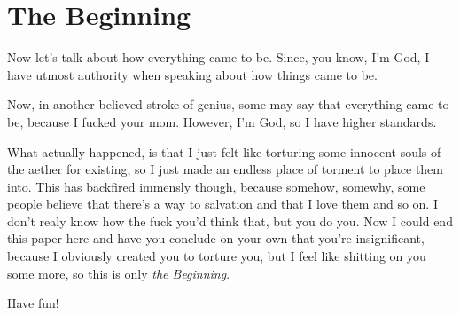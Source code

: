 \section{The Beginning}

Now let's talk about how everything came to be. Since, you know, I'm God, I have utmost authority when speaking about how things came to be.

Now, in another believed stroke of genius, some may say that everything came to be, because I fucked your mom. However, I'm God, so I have higher standards.

What actually happened, is that I just felt like torturing some innocent souls of the aether for existing, so I just made an endless place of torment to place them into.
This has backfired immensly though, because somehow, somewhy, some people believe that there's a way to salvation and that I love them and so on. I don't realy know how the fuck
you'd think that, but you do you. Now I could end this paper here and have you conclude on your own that you're insignificant, because I obviously created you to torture you, but
I feel like shitting on you some more, so this is only \emph{the Beginning}.

\begin{center}
  Have fun!
\end{center}
